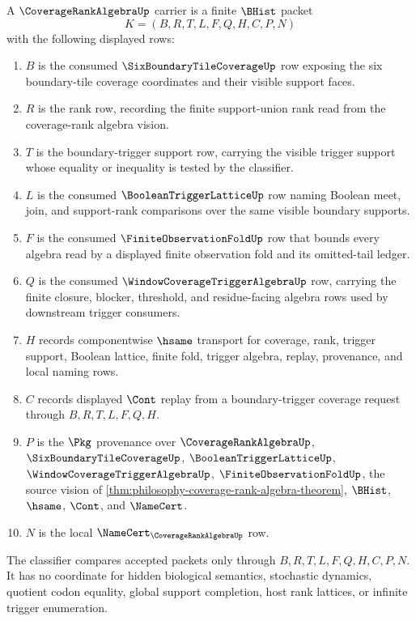 \begin{definition}
\label{def:coverage-rank-algebra-carrier}
A $\CoverageRankAlgebraUp$ carrier is a finite $\BHist$ packet
$$
K=(B,R,T,L,F,Q,H,C,P,N)
$$
with the following displayed rows:
\begin{enumerate}
\item $B$ is the consumed $\SixBoundaryTileCoverageUp$ row exposing the six boundary-tile coverage coordinates and their visible support faces.
\item $R$ is the rank row, recording the finite support-union rank read from the coverage-rank algebra vision.
\item $T$ is the boundary-trigger support row, carrying the visible trigger support whose equality or inequality is tested by the classifier.
\item $L$ is the consumed $\BooleanTriggerLatticeUp$ row naming Boolean meet, join, and support-rank comparisons over the same visible boundary supports.
\item $F$ is the consumed $\FiniteObservationFoldUp$ row that bounds every algebra read by a displayed finite observation fold and its omitted-tail ledger.
\item $Q$ is the consumed $\WindowCoverageTriggerAlgebraUp$ row, carrying the finite closure, blocker, threshold, and residue-facing algebra rows used by downstream trigger consumers.
\item $H$ records componentwise $\hsame$ transport for coverage, rank, trigger support, Boolean lattice, finite fold, trigger algebra, replay, provenance, and local naming rows.
\item $C$ records displayed $\Cont$ replay from a boundary-trigger coverage request through $B,R,T,L,F,Q,H$.
\item $P$ is the $\Pkg$ provenance over $\CoverageRankAlgebraUp$, $\SixBoundaryTileCoverageUp$, $\BooleanTriggerLatticeUp$, $\WindowCoverageTriggerAlgebraUp$, $\FiniteObservationFoldUp$, the source vision of \autoref{thm:philosophy-coverage-rank-algebra-theorem}, $\BHist$, $\hsame$, $\Cont$, and $\NameCert$.
\item $N$ is the local $\NameCert_{\CoverageRankAlgebraUp}$ row.
\end{enumerate}
The classifier compares accepted packets only through $B,R,T,L,F,Q,H,C,P,N$. It has no coordinate for hidden biological semantics, stochastic dynamics, quotient codon equality, global support completion, host rank lattices, or infinite trigger enumeration.
\end{definition}

